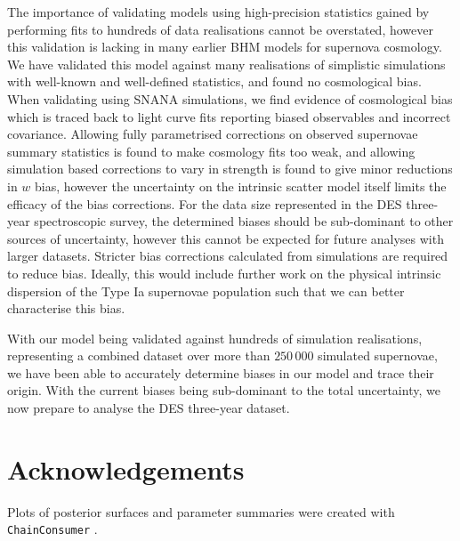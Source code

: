 \documentclass[a4paper,fleqn,usenatbib]{mnras}
\begin{document}
The importance of validating models using high-precision statistics gained by performing fits to hundreds of data realisations cannot be overstated, however this validation is lacking in many earlier BHM models for supernova cosmology. We have validated this model against many realisations of simplistic simulations with well-known and well-defined statistics, and found no cosmological bias. When validating using SNANA simulations, we find evidence of cosmological bias which is traced back to light curve fits reporting biased observables and incorrect covariance. Allowing fully parametrised corrections on observed supernovae summary statistics is found to make cosmology fits too weak, and allowing simulation based corrections to vary in strength is found to give minor reductions in $w$ bias, however the uncertainty on the intrinsic scatter model itself limits the efficacy of the bias corrections. For the data size represented in the DES three-year spectroscopic survey, the determined biases should be sub-dominant to other sources of uncertainty, however this cannot be expected for future analyses with larger datasets. Stricter bias corrections calculated from simulations are required to reduce bias. Ideally, this would include further work on the physical intrinsic dispersion of the Type Ia supernovae population such that we can better characterise this bias.

With our model being validated against hundreds of simulation realisations, representing a combined dataset over more than $250\,000$ simulated supernovae, we have been able to accurately determine biases in our model and trace their origin. With the current biases being sub-dominant to the total uncertainty, we now prepare to analyse the DES three-year dataset.

\section*{Acknowledgements}

Plots of posterior surfaces and parameter summaries were created with \verb|ChainConsumer| \citep{Hinton2016}.











\end{document}
